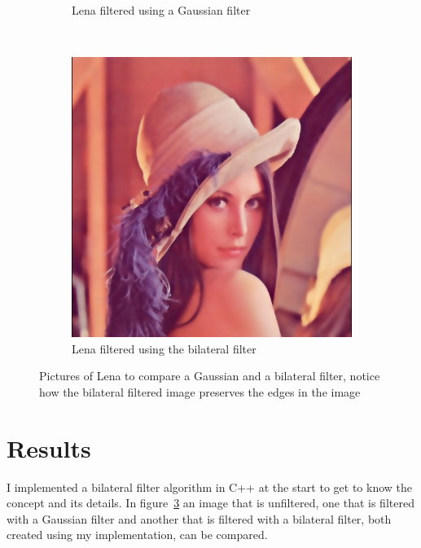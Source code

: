 \documentclass[review]{acmsiggraph}
\begin{document}
\begin{figure}
\begin{subfigure}[b]{0.3\textwidth}
                \caption{Lena filtered using a Gaussian filter}
                \label{fig:lenaGaussian}
        \end{subfigure}
        ~ %
        \begin{subfigure}[b]{0.3\textwidth}
                \centering
                \includegraphics[width=\textwidth]{images/outD=3R=50.jpg}
                \caption{Lena filtered using the bilateral filter}
                \label{fig:lenaBilateral}
        \end{subfigure}
        \caption{Pictures of Lena to compare a Gaussian and a bilateral filter, notice how the bilateral filtered image preserves the edges in the image}
        \label{fig:lenas}
\end{figure}

\section{Results}
I implemented a bilateral filter algorithm in C++ at the start to get to know the concept and its details.
In figure~\ref{fig:lenas} an image that is unfiltered, one that is filtered with a Gaussian filter and another that is filtered with a bilateral filter, both created using my implementation, can be compared.
\end{document}
